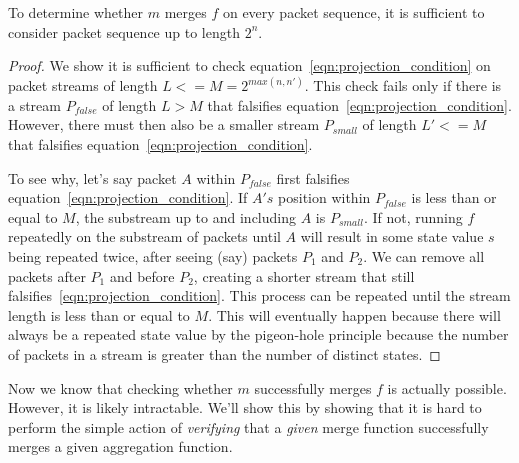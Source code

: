 \begin{theorem}
To determine whether $m$ merges $f$ on every packet sequence, it is sufficient to consider packet sequence up to
length $2^n$.
\end{theorem}
\begin{proof}
We show it is sufficient to check equation~\ref{eqn:projection_condition} on
packet streams of length $L <= M = 2^{max(n, n')}$. This check fails only if
there is a stream $P_{false}$ of length $L > M$ that falsifies
equation~\ref{eqn:projection_condition}. However, there must then also be a
smaller stream $P_{small}$ of length $L'<=M$ that falsifies
equation~\ref{eqn:projection_condition}.

To see why, let's say packet $A$ within $P_{false}$ first falsifies
equation~\ref{eqn:projection_condition}. If $A's$ position within $P_{false}$
is less than or equal to $M$, the substream up to and including $A$ is
$P_{small}$. If not, running $f$ repeatedly on the substream of packets until
$A$ will result in some state value $s$ being repeated twice, after seeing
(say) packets $P_{1}$ and $P_{2}$. We can remove all packets after $P_{1}$ and
before $P_{2}$, creating a shorter stream that still
falsifies~\ref{eqn:projection_condition}.  This process can be repeated until
the stream length is less than or equal to $M$. This will eventually happen
because there will always be a repeated state value by the pigeon-hole
principle because the number of packets in a stream is greater than the number
of distinct states.
\end{proof}

Now we know that checking whether $m$ successfully merges $f$ is actually possible.
However, it is likely intractable. We'll show this by showing that it is hard to perform the
 simple action of \emph{verifying}
that a \emph{given} merge function successfully merges a given aggregation function.

